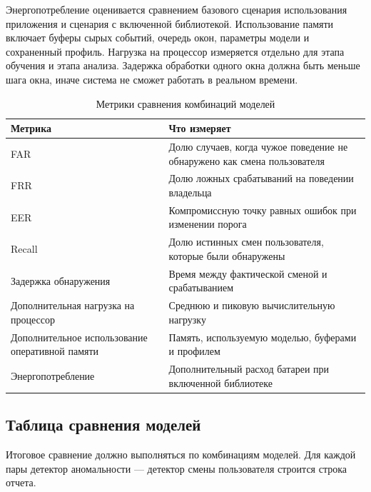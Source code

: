 \documentclass[oneside,senior,etd]{BYUPhys}
\begin{document}
Энергопотребление оценивается сравнением базового сценария использования приложения и сценария с включенной библиотекой. Использование памяти включает буферы сырых событий, очередь окон, параметры модели и сохраненный профиль. Нагрузка на процессор измеряется отдельно для этапа обучения и этапа анализа. Задержка обработки одного окна должна быть меньше шага окна, иначе система не сможет работать в реальном времени.

\begin{table}[ht]
\centering
\caption{Метрики сравнения комбинаций моделей}
\label{tab:metrics}
\begin{tabular}{|p{}|p{}|}
\hline
\textbf{Метрика} & \textbf{Что измеряет} \\
\hline
FAR & Долю случаев, когда чужое поведение не обнаружено как смена пользователя \\
\hline
FRR & Долю ложных срабатываний на поведении владельца \\
\hline
EER & Компромиссную точку равных ошибок при изменении порога \\
\hline
Recall & Долю истинных смен пользователя, которые были обнаружены \\
\hline
Задержка обнаружения & Время между фактической сменой и срабатыванием \\
\hline
Дополнительная нагрузка на процессор & Среднюю и пиковую вычислительную нагрузку \\
\hline
Дополнительное использование оперативной памяти & Память, используемую моделью, буферами и профилем \\
\hline
Энергопотребление & Дополнительный расход батареи при включенной библиотеке \\
\hline
\end{tabular}
\end{table}

\clearpage

\subsection{Таблица сравнения моделей}

Итоговое сравнение должно выполняться по комбинациям моделей. Для каждой пары детектор аномальности --- детектор смены пользователя строится строка отчета.

\begingroup
\scriptsize
\setlength{\tabcolsep}{2pt}
\renewcommand{\arraystretch}{1.15}
\end{document}

